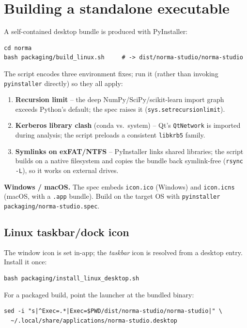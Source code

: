 \documentclass[11pt,a4paper]{article}
\newcommand{\code}[1]{\texttt{#1}}
\begin{document}
\section{Building a standalone executable}
A self-contained desktop bundle is produced with PyInstaller:
\begin{lstlisting}
cd norma
bash packaging/build_linux.sh     # -> dist/norma-studio/norma-studio
\end{lstlisting}
The script encodes three environment fixes; run it (rather than invoking \code{pyinstaller}
directly) so they all apply:
\begin{enumerate}[nosep,leftmargin=1.6em]
  \item \textbf{Recursion limit} -- the deep NumPy/SciPy/scikit-learn import graph exceeds
        Python's default; the spec raises it (\code{sys.setrecursionlimit}).
  \item \textbf{Kerberos library clash} (conda vs.\ system) -- Qt's \code{QtNetwork} is
        imported during analysis; the script preloads a consistent \code{libkrb5} family.
  \item \textbf{Symlinks on exFAT/NTFS} -- PyInstaller links shared libraries; the script
        builds on a native filesystem and copies the bundle back symlink-free
        (\code{rsync -L}), so it works on external drives.
\end{enumerate}

\noindent\textbf{Windows / macOS.} The spec embeds \code{icon.ico} (Windows) and
\code{icon.icns} (macOS, with a \code{.app} bundle). Build on the target OS with
\code{pyinstaller packaging/norma-studio.spec}.

\subsection{Linux taskbar/dock icon}
The window icon is set in-app; the \emph{taskbar} icon is resolved from a desktop entry.
Install it once:
\begin{lstlisting}
bash packaging/install_linux_desktop.sh
\end{lstlisting}
For a packaged build, point the launcher at the bundled binary:
\begin{lstlisting}
sed -i "s|^Exec=.*|Exec=$PWD/dist/norma-studio/norma-studio|" \
  ~/.local/share/applications/norma-studio.desktop
\end{lstlisting}

\end{document}
